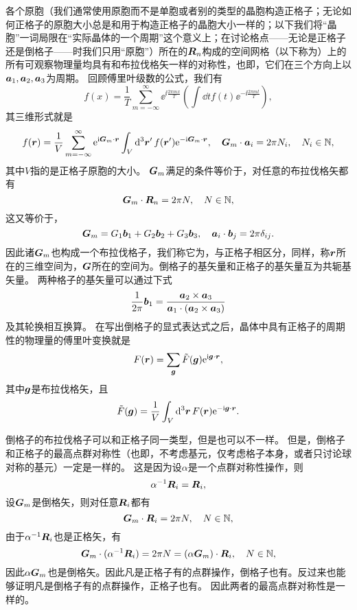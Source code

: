 各个原胞（我们通常使用原胞而不是单胞或者别的类型的晶胞构造正格子；无论如何正格子的原胞大小总是和用于构造正格子的晶胞大小一样的；以下我们将“晶胞”一词局限在“实际晶体的一个周期”这个意义上；在讨论格点——无论是正格子还是倒格子——时我们只用“原胞”）所在的$\vb*{R}_n$构成的空间网格（以下称为）上的所有可观察物理量均具有和布拉伐格矢一样的对称性，也即，它们在三个方向上以$\vb*{a}_1,\vb*{a}_2,\vb*{a}_3$为周期。
回顾傅里叶级数的公式，我们有
\[
    f(x) = \frac{1}{T} \sum_{m=-\infty}^\infty \ee^{\ii \frac{2\pi m x}{T}} \left(\int \dd{t} f(t) \ee^{-\ii \frac{2\pi m t}{T}}\right) ,
\]
其三维形式就是
\[
    f(\vb*{r}) = \frac{1}{V} \sum_{m=-\infty}^\infty \mathrm{e}^{\mathrm{i} \vb*{G}_m \cdot \vb*{r}} \int_V \dd[3]{\vb*{r}'} f(\vb*{r}') \mathrm{e}^{- \mathrm{i} \vb*{G}_m \cdot \vb*{r}}, \quad \vb*{G}_m \cdot \vb*{a}_i = 2\pi N_i, \quad N_i \in \mathbb{N},
\]
其中$V$指的是正格子原胞的大小。
$\vb*{G}_m$满足的条件等价于，对任意的布拉伐格矢都有
\begin{equation}
    \vb*{G}_m \cdot \vb*{R}_n = 2\pi N, \quad N \in \mathbb{N},
\end{equation}
这又等价于，
\begin{equation}
    \vb*{G}_m = G_1 \vb*{b}_1 + G_2 \vb*{b}_2 + G_3 \vb*{b}_3, \quad \vb*{a}_i \cdot \vb*{b}_j = 2 \pi \delta_{ij}.
\end{equation}
因此诸$\vb*{G}_m$也构成一个布拉伐格子，我们称它为，与正格子相区分，同样，称$\vb*{r}$所在的三维空间为，$\vb*{G}$所在的空间为。倒格子的基矢量和正格子的基矢量互为共轭基矢量。
两种格子的基矢量可以通过下式
\begin{equation}
    \frac{1}{2\pi} \vb*{b}_1 = \frac{\vb*{a}_2 \times \vb*{a}_3}{\vb*{a}_1 \cdot (\vb*{a}_2 \times \vb*{a}_3)}
\end{equation}
及其轮换相互换算。
在写出倒格子的显式表达式之后，晶体中具有正格子的周期性的物理量的傅里叶变换就是
\begin{equation}
    F(\vb*{r}) = \sum_{\vb*{g}} \tilde{F}(\vb*{g}) \mathrm{e}^{\mathrm{i} \vb*{g} \cdot \vb*{r}},
\end{equation}
其中$\vb*{g}$是布拉伐格矢，且
\begin{equation}
    \tilde{F}(\vb*{g}) = \frac{1}{V} \int_V \dd[3]{\vb*{r}} F(\vb*{r}) \mathrm{e}^{-\mathrm{i} \vb*{g} \cdot \vb*{r}}.
\end{equation}

倒格子的布拉伐格子可以和正格子同一类型，但是也可以不一样。
但是，倒格子和正格子的最高点群对称性（也即，不考虑基元，仅考虑格子本身，或者只讨论球对称的基元）一定是一样的。
这是因为设$\alpha$是一个点群对称性操作，则
\[
    \alpha^{-1} \vb*{R}_i = \vb*{R}_i,
\]
设$\vb*{G}_m$是倒格矢，则对任意$\vb*{R}_i$都有
\[
    \vb*{G}_m \cdot \vb*{R}_i = 2 \pi N, \quad N \in \mathbb{N},
\]
由于$\alpha^{-1} \vb*{R}_i$也是正格矢，有
\[
    \vb*{G}_m \cdot (\alpha^{-1} \vb*{R}_i) = 2 \pi N = (\alpha \vb*{G}_m) \cdot \vb*{R}_i, \quad N \in \mathbb{N},
\]
因此$\alpha \vb*{G}_m$也是倒格矢。因此凡是正格子有的点群操作，倒格子也有。反过来也能够证明凡是倒格子有的点群操作，正格子也有。
因此两者的最高点群对称性是一样的。

